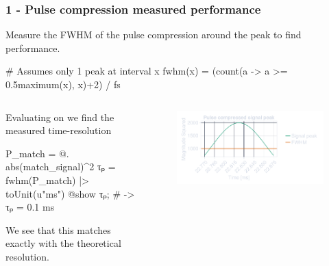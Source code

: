 \documentclass[compress,aspectratio=169]{beamer}
\begin{document}
\begin{frame}[fragile] %
    \frametitle{1 - Pulse compression measured performance}
    Measure the FWHM of the pulse compression around the peak to find performance.
    \begin{jllisting}[gobble=8]
        # Assumes only 1 peak at interval x
        fwhm(x) = (count(a -> a >= 0.5maximum(x), x)+2) / fs
    \end{jllisting}

    \begin{columns}
        \begin{column}{0.5\textwidth}
            Evaluating  on  we find the
            measured time-resolution
            \begin{jllisting}[gobble=16]
                P_match = @. abs(match_signal)^2
                τₚ = fwhm(P_match) |> toUnit(u"ms")
                @show τₚ; # -> τₚ = 0.1 ms
            \end{jllisting}
            We see that this matches exactly with the theoretical resolution.
        \end{column}
        \begin{column}{0.5\textwidth}
            \begin{figure}
                \includegraphics[width=\columnwidth]{"../2.pdf"}
            \end{figure}
        \end{column}
    \end{columns}
\end{frame}
\end{document}
